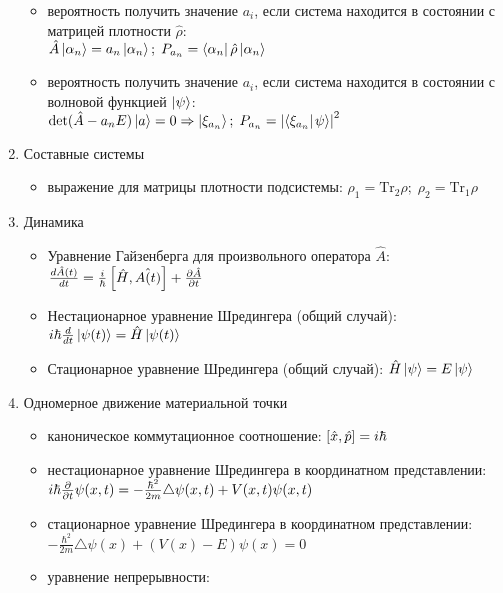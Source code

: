 \begin{enumerate}[label=\textbf{\underline{\arabic*.}}]
\begin{itemize}
            \item вероятность получить значение $a_i$, если система находится в состоянии с матрицей плотности $\hat{\rho}$: \\
            $ \hat{A}\ket{\alpha_n}=a_n\ket{\alpha_n};\; P_{a_n} = \matrixel{\alpha_n}{\hat{\rho}}{\alpha_n} $
            \item вероятность получить значение $a_i$, если система находится в состоянии с волновой функцией $\left| \psi \right>$: \\
            $ \text{det}(\hat{A}-a_n E)\ket{a} = 0 \Rightarrow \ket{\xi_{a_n}};\; P_{a_n} = \abs{\braket{\xi_{a_n}}{\psi}}^2 $
        \end{itemize}
\item Составные системы  \begin{itemize}
            \item выражение для матрицы плотности подсистемы:
            $ \rho_1 = \text{Tr}_2 \rho;\; \rho_2 = \text{Tr}_1 \rho $
        \end{itemize}
\item Динамика  \begin{itemize}
            \item Уравнение Гайзенберга для произвольного оператора $\hat{A}$:
            $ \frac{d \hat{A}(t)}{d t}=\frac{i}{\hbar}\left[ \hat{H}, \hat{A(t)} \right]+\frac{\partial \hat{A}}{\partial t} $
            \item Нестационарное уравнение Шредингера (общий случай):
            $ i\hbar \frac{d }{d t}\left| \psi(t) \right> = \hat{H}\left| \psi(t) \right> $
            \item Стационарное уравнение Шредингера (общий случай):
            $ \hat{H}\left| \psi \right> = E\left| \psi \right> $
        \end{itemize}
\item Одномерное движение материальной точки  \begin{itemize}
            \item каноническое коммутационное соотношение:
            $ \left[ \hat{x}, \hat{p} \right] = i\hbar $
            \item нестационарное уравнение Шредингера в координатном представлении: \\
            $ i\hbar \frac{\partial }{\partial t}\psi(x,t) = -\frac{\hbar^2}{2m}\triangle\psi(x,t)+V(x,t)\psi(x,t) $
            \item стационарное уравнение Шредингера в координатном представлении: \\
            $ -\frac{\hbar^2}{2m}\triangle\psi(x) + (V(x)-E)\psi(x) = 0 $
            \item уравнение непрерывности:

\end{itemize}
\end{enumerate}
